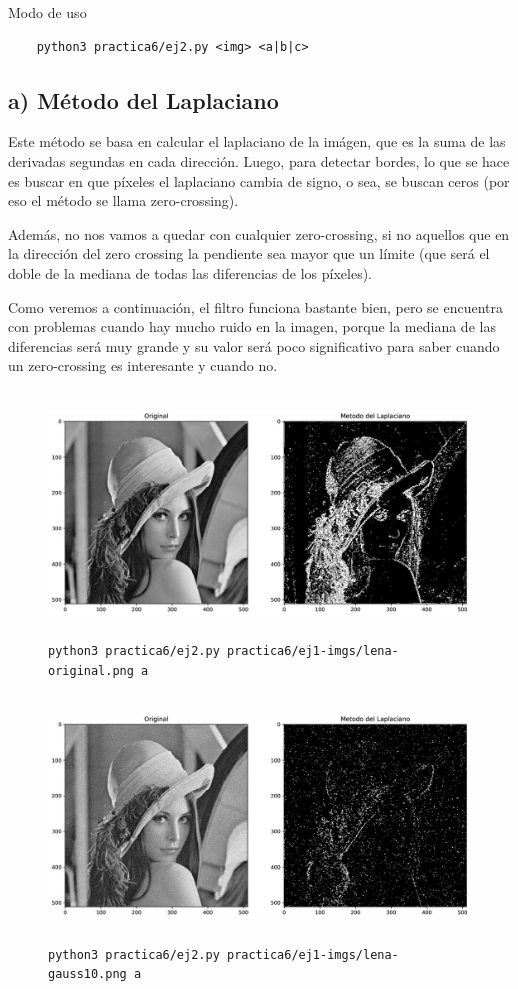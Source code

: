 \documentclass[11pt, spanish]{article}
\begin{document}
Modo de uso
\begin{verbatim}
    python3 practica6/ej2.py <img> <a|b|c>
\end{verbatim}


\newpage
\subsection{a) Método del Laplaciano}

Este método se basa en calcular el laplaciano de la imágen, que es la suma de las derivadas segundas en cada dirección.
Luego, para detectar bordes, lo que se hace  es buscar en que píxeles el laplaciano cambia de signo, o sea, se buscan ceros (por eso el método se llama zero-crossing).

Además, no nos vamos a quedar con cualquier zero-crossing, si no aquellos que en la dirección del zero crossing la pendiente sea mayor que un límite (que será el doble de la mediana de todas las diferencias de los píxeles).

Como veremos a continuación, el filtro funciona bastante bien, pero se encuentra con problemas cuando hay mucho ruido en la imagen, porque la mediana de las diferencias  será muy grande y su valor será poco significativo para saber cuando un zero-crossing es interesante y cuando no.


\begin{figure}[H]
\centering
    \includegraphics[height=6.5cm]{informe-imgs/ej2-a-lena-original.jpg}
    \caption{\texttt{python3 practica6/ej2.py practica6/ej1-imgs/lena-original.png a}}
\end{figure}

\begin{figure}[H]
\centering
    \includegraphics[height=6.5cm]{informe-imgs/ej2-a-lena-gauss10.jpg}
    \caption{\texttt{python3 practica6/ej2.py practica6/ej1-imgs/lena-gauss10.png a}}
\end{figure}
\end{document}
